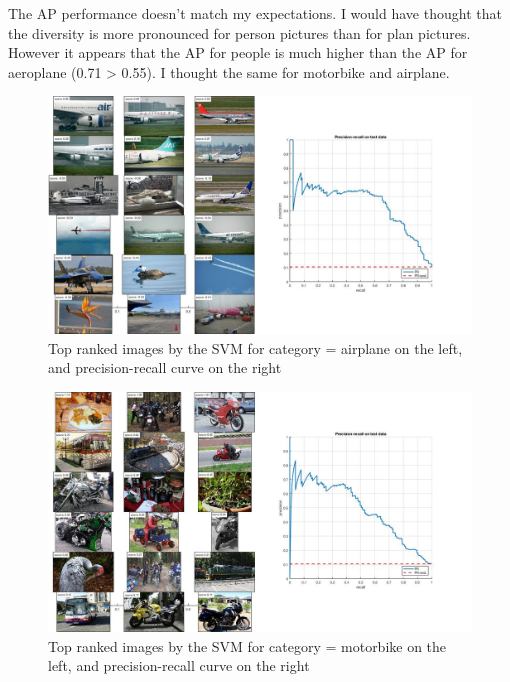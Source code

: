 \documentclass[a4paper,11pt]{exam}
\begin{document}
The AP performance doesn't match my expectations. I would have thought that the diversity is more pronounced for person pictures than for plan pictures. However it appears that the AP for people is much higher than the AP for aeroplane (0.71 > 0.55). I thought the same for motorbike and airplane.\\


\begin{figure}[!h]
\centering
\includegraphics[width=13cm]{figures/svm_res_airplane.jpg}
\caption{Top ranked images by the SVM for category = airplane on the left, and precision-recall curve on the right}    
\label{svm_res_airplane}
\end{figure}

\begin{figure}[!h]
\centering
\includegraphics[width=13cm]{figures/svm_res_motorbike.jpg}
\caption{Top ranked images by the SVM for category = motorbike on the left, and precision-recall curve on the right}    
\label{svm_res_motorbike}
\end{figure}
\end{document}
